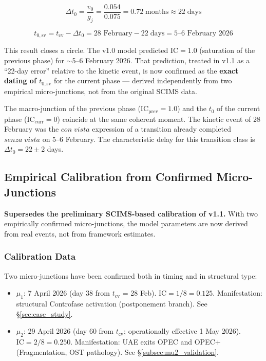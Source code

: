 \documentclass[12pt,a4paper]{article}
\newcommand{\gj}{g_j}
\newcommand{\IC}{\mathrm{IC}}
\begin{document}
\begin{equation}\label{eq:t0_retro}
\Delta t_0 = \frac{v_0}{\gj} = \frac{0.054}{0.075} = 0.72 \;\text{months} \approx 22 \;\text{days}
\end{equation}

\begin{equation}
t_{0,\mathrm{sv}} = t_{\mathrm{cv}} - \Delta t_0 = \text{28 February} - 22\;\text{days} = \text{5--6 February 2026}
\end{equation}

This result closes a circle. The v1.0 model predicted $\IC = 1.0$ (saturation of the previous phase) for $\sim$5--6 February 2026. That prediction, treated in v1.1 as a ``22-day error'' relative to the kinetic event, is now confirmed as the \textbf{exact dating of $t_{0,\mathrm{sv}}$} for the current phase --- derived independently from two empirical micro-junctions, not from the original SCIMS data.

The macro-junction of the previous phase ($\IC_{\mathrm{prev}} = 1.0$) and the $t_0$ of the current phase ($\IC_{\mathrm{curr}} = 0$) coincide at the same coherent moment. The kinetic event of 28 February was the $con\;vista$ expression of a transition already completed $senza\;vista$ on 5--6 February. The characteristic delay for this transition class is $\Delta t_0 = 22 \pm 2$ days.

\subsection{Empirical Calibration from Confirmed Micro-Junctions}\label{subsec:calibration}

\textbf{Supersedes the preliminary SCIMS-based calibration of v1.1.} With two empirically confirmed micro-junctions, the model parameters are now derived from real events, not from framework estimates.

\subsubsection{Calibration Data}

Two micro-junctions have been confirmed both in timing and in structural type:

\begin{itemize}[leftmargin=2em]
    \item $\mu_1$: 7 April 2026 (day 38 from $t_{\mathrm{cv}}$ = 28 Feb). $\IC = 1/8 = 0.125$. Manifestation: structural Controfase activation (postponement branch). See \S\ref{sec:case_study}.
    \item $\mu_2$: 29 April 2026 (day 60 from $t_{\mathrm{cv}}$; operationally effective 1 May 2026). $\IC = 2/8 = 0.250$. Manifestation: UAE exits OPEC and OPEC+ (Fragmentation, OST pathology). See \S\ref{subsec:mu2_validation}.
\end{itemize}
\end{document}
